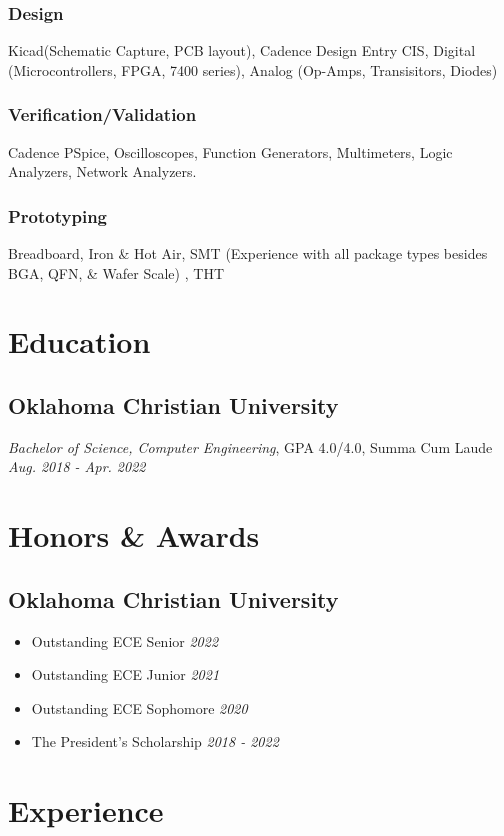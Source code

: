 \documentclass{article}
\begin{document}
\begin{spacing}{.5}
		\subsubsection{Design} \large{Kicad(Schematic Capture, PCB layout), Cadence Design Entry CIS, Digital} \small{(Microcontrollers, FPGA, 7400 series)}\large{, Analog} \small{(Op-Amps, Transisitors, Diodes)}
		\large{\subsubsection{Verification/Validation} Cadence PSpice, Oscilloscopes, Function Generators, Multimeters, Logic Analyzers, Network Analyzers.}
		\subsubsection{Prototyping} \large{Breadboard, Iron \& Hot Air, SMT} \small{(Experience with all package types besides BGA, QFN, \& Wafer Scale)} \large{, THT}

\section{Education}
	\subsection{Oklahoma Christian University}
		\textit{Bachelor of Science, Computer Engineering}, GPA 4.0/4.0, Summa Cum Laude \hfill \small{\textsl{Aug. 2018 - Apr. 2022}}

\section{Honors \& Awards}
	\subsection{Oklahoma Christian University}
		\begin{itemize}[label=$\bullet$,itemsep=-.75ex]
			\item \large{Outstanding ECE Senior} \hfill \small{\textsl{2022}}
			\item \large{Outstanding ECE Junior} \hfill \small{\textsl{2021}}
			\item \large{Outstanding ECE Sophomore} \hfill \small{\textsl{2020}}
			\item \large{The President's Scholarship} \hfill \small{\textsl{2018 - 2022}}
		\end{itemize}
\section{Experience}

\end{spacing}
\end{document}

